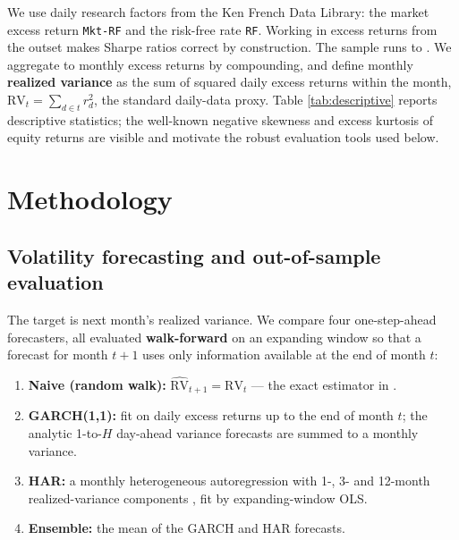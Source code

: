 \documentclass[11pt]{article}
\begin{document}
We use daily research factors from the Ken French Data Library: the market excess
return \texttt{Mkt-RF} and the risk-free rate \texttt{RF}. Working in excess
returns from the outset makes Sharpe ratios correct by construction. The sample
runs \dataStart{} to \dataEnd. We aggregate to monthly excess returns by
compounding, and define monthly \textbf{realized variance} as the sum of squared
daily excess returns within the month,
\(\mathrm{RV}_t=\sum_{d\in t} r_d^2\), the standard daily-data proxy. Table
\ref{tab:descriptive} reports descriptive statistics; the well-known negative
skewness and excess kurtosis of equity returns are visible and motivate the
robust evaluation tools used below.



\section{Methodology}

\subsection{Volatility forecasting and out-of-sample evaluation}

The target is next month's realized variance. We compare four one-step-ahead
forecasters, all evaluated \textbf{walk-forward} on an expanding window so that a
forecast for month $t+1$ uses only information available at the end of month $t$:

\begin{enumerate}[leftmargin=1.4em,itemsep=0.1em]
  \item \textbf{Naive (random walk):} $\widehat{\mathrm{RV}}_{t+1}=\mathrm{RV}_t$
        --- the exact estimator in \citet{moreira2017volatility}.
  \item \textbf{GARCH(1,1):} fit on daily excess returns up to the end of month
        $t$; the analytic 1-to-$H$ day-ahead variance forecasts are summed to a
        monthly variance.
  \item \textbf{HAR:} a monthly heterogeneous autoregression with 1-, 3- and
        12-month realized-variance components \citep{corsi2009simple}, fit by
        expanding-window OLS.
  \item \textbf{Ensemble:} the mean of the GARCH and HAR forecasts.
\end{enumerate}
\end{document}
